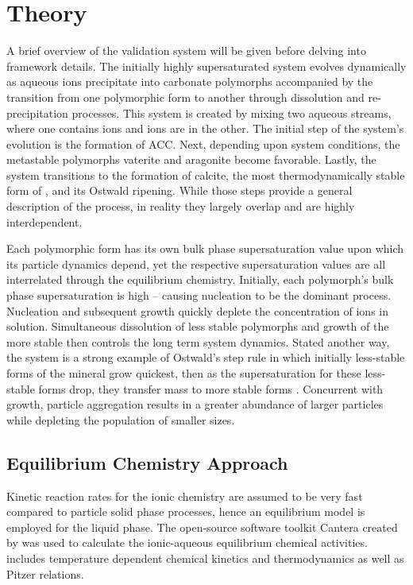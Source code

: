 \documentclass[preprint,3p,a4paper,times,12pt,authoryear]{elsarticle}
\begin{document}
\section{Theory} 
\label{theory}
A brief overview of the validation system will be given before delving into framework details.  The initially highly supersaturated  system evolves dynamically as aqueous ions precipitate into carbonate polymorphs accompanied by the transition from one polymorphic form to another through dissolution and re-precipitation processes.  This system is created by mixing two aqueous streams, where one contains  ions and  ions are in the other.  The initial step of the system's evolution is the formation of ACC. Next, depending upon system conditions, the metastable polymorphs vaterite and aragonite become favorable. Lastly, the system transitions to the formation of calcite, the most thermodynamically stable form of , and its Ostwald ripening.  While those steps provide a general description of the process, in reality they largely overlap and are highly interdependent. 

Each polymorphic form has its own bulk phase supersaturation value upon which its particle dynamics depend, yet the respective supersaturation values are all interrelated through the equilibrium chemistry. Initially, each polymorph's bulk phase supersaturation is high -- causing nucleation to be the dominant process.  Nucleation and subsequent growth quickly deplete the concentration of ions in solution. Simultaneous dissolution of less stable polymorphs and growth of the more stable then controls the long term system dynamics. Stated another way, the system is a strong example of Ostwald's step rule \citep{Ostwald1897} in which initially less-stable forms of the mineral grow quickest, then as the supersaturation for these less-stable forms drop, they transfer mass to more stable forms \citep{Threlfall2003}. Concurrent with growth, particle aggregation results in a greater abundance of larger particles while depleting the population of smaller sizes.

\subsection{Equilibrium Chemistry Approach }
 \label{Eq_Chem_Sec}
Kinetic reaction rates for the ionic chemistry are assumed to be very fast compared to particle solid phase processes, hence an equilibrium model is employed for the liquid phase.  The open-source software toolkit Cantera created by \cite{Cantera} was used to calculate the ionic-aqueous equilibrium chemical activities.  \citeauthor{Cantera} includes temperature dependent chemical kinetics and thermodynamics as well as Pitzer relations.
\end{document}
